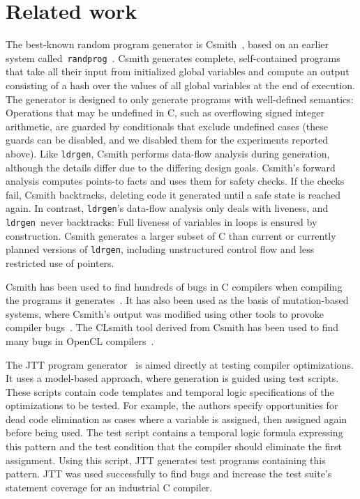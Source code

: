 \documentclass{llncs}
\newcommand\ldrgen{\texttt{ldrgen}}
\begin{document}
\section{Related work}

The best-known random program generator is Csmith~\cite{csmith-2011}, based
on an earlier system
called~\texttt{randprog}~\cite{eide.regehr-2008,randprog-2007}. Csmith
generates complete, self-contained programs that take all their input from
initialized global variables and compute an output consisting of a hash over
the values of all global variables at the end of execution. The generator is
designed to only generate programs with well-defined semantics: Operations
that may be undefined in C, such as overflowing signed integer arithmetic,
are guarded by conditionals that exclude undefined cases (these guards can
be disabled, and we disabled them for the experiments reported above). Like
\ldrgen, Csmith performs data-flow analysis during generation, although the
details differ due to the differing design goals. Csmith's forward analysis
computes points-to facts and uses them for safety checks. If the checks
fail, Csmith backtracks, deleting code it generated until a safe state is
reached again. In contrast, \ldrgen's data-flow analysis only deals with
liveness, and \ldrgen\ never backtracks: Full liveness of variables in loops
is ensured by construction. Csmith generates a larger subset of C than
current or currently planned versions of \ldrgen, including unstructured
control flow and less restricted use of pointers.

Csmith has been used to find hundreds of bugs in C compilers when compiling
the programs it generates~\cite{csmith-2011}. It has also been used as the
basis of mutation-based systems, where Csmith's output was modified using
other tools to provoke compiler bugs~\cite{le.etal-2014}. The CLsmith tool
derived from Csmith has been used to find many bugs in OpenCL
compilers~\cite{lidbury.etal-2015}.


The JTT program generator~\cite{zhao.etal-2009} is aimed directly at testing
compiler optimizations. It uses a model-based approach, where generation is
guided using test scripts. These scripts contain code templates and temporal
logic specifications of the optimizations to be tested. For example, the
authors specify opportunities for dead code elimination as cases where a
variable is assigned, then assigned again before being used. The test script
contains a temporal logic formula expressing this pattern and the test
condition that the compiler should eliminate the first assignment. Using
this script, JTT generates test programs containing this pattern. JTT was
used successfully to find bugs and increase the test suite's statement
coverage for an industrial C compiler.
\end{document}
